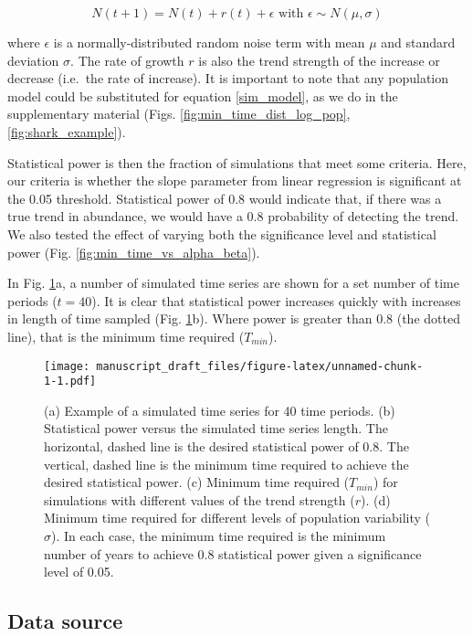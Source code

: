 \documentclass[12pt,]{article}
\begin{document}
\begin{equation}
N(t + 1) = N(t) + r(t) + \epsilon \mbox{ with } \epsilon \sim N(\mu, \sigma)
\label{sim_model}
\end{equation}

where \(\epsilon\) is a normally-distributed random noise term with mean
\(\mu\) and standard deviation \(\sigma\). The rate of growth \(r\) is
also the trend strength of the increase or decrease (i.e.~the rate of
increase). It is important to note that any population model could be
substituted for equation \ref{sim_model}, as we do in the supplementary
material (Figs. \ref{fig:min_time_dist_log_pop},
\ref{fig:shark_example}).

Statistical power is then the fraction of simulations that meet some
criteria. Here, our criteria is whether the slope parameter from linear
regression is significant at the 0.05 threshold. Statistical power of
0.8 would indicate that, if there was a true trend in abundance, we
would have a 0.8 probability of detecting the trend. We also tested the
effect of varying both the significance level and statistical power
(Fig. \ref{fig:min_time_vs_alpha_beta}).

In Fig. \ref{fig:theoretical_approach}a, a number of simulated time
series are shown for a set number of time periods (\(t=40\)). It is
clear that statistical power increases quickly with increases in length
of time sampled (Fig. \ref{fig:theoretical_approach}b). Where power is
greater than 0.8 (the dotted line), that is the minimum time required
(\(T_{min}\)).

\begin{figure}[htbp]
\centering
\texttt{[image: manuscript\_draft\_files/figure-latex/unnamed-chunk-1-1.pdf]}
\caption{(a) Example of a simulated time series for 40 time periods. (b)
Statistical power versus the simulated time series length. The
horizontal, dashed line is the desired statistical power of 0.8. The
vertical, dashed line is the minimum time required to achieve the
desired statistical power. (c) Minimum time required (\(T_{min}\)) for
simulations with different values of the trend strength (\(r\)). (d)
Minimum time required for different levels of population variability
(\(\sigma\)). In each case, the minimum time required is the minimum
number of years to achieve 0.8 statistical power given a significance
level of 0.05.\label{fig:theoretical_approach}}
\end{figure}

\subsection{Data source}\label{data-source}
\end{document}
